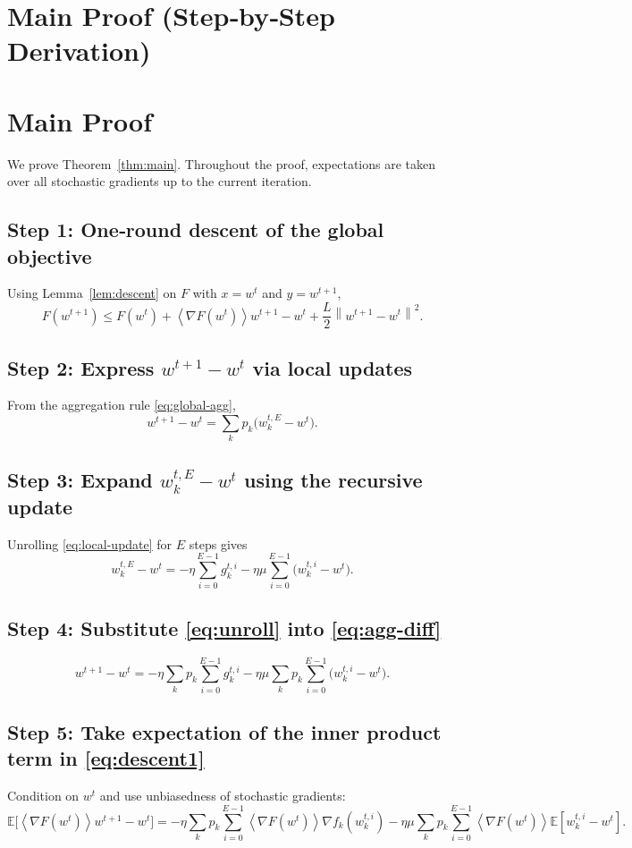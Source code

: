 \documentclass{article}
\newcommand{\E}{\mathbb{E}}
\newcommand{\norm}[1]{\left\lVert#1\right\rVert}
\newcommand{\inner}[1]{\left\langle#1\right\rangle}
\begin{document}
\section*{Main Proof (Step‑by‑Step Derivation)}
\section{Main Proof}
We prove Theorem~\ref{thm:main}.  Throughout the proof,
expectations are taken over all stochastic gradients up to the current
iteration.

\subsection*{Step 1: One‑round descent of the global objective}
Using Lemma~\ref{lem:descent} on $F$ with $x=w^{t}$ and $y=w^{t+1}$,
\[
F(w^{t+1})\le F(w^{t})+\inner{\nabla F(w^{t})}{w^{t+1}-w^{t}}
          +\frac{L}{2}\norm{w^{t+1}-w^{t}}^{2}.
\tag{1}
\label{eq:descent1}
\]

\subsection*{Step 2: Express $w^{t+1}-w^{t}$ via local updates}
From the aggregation rule \eqref{eq:global-agg},
\[
w^{t+1}-w^{t}= \sum_{k}p_k\bigl(w_{k}^{t,E}-w^{t}\bigr).
\tag{2}
\label{eq:agg-diff}
\]

\subsection*{Step 3: Expand $w_{k}^{t,E}-w^{t}$ using the recursive update}
Unrolling \eqref{eq:local-update} for $E$ steps gives
\[
w_{k}^{t,E}-w^{t}= -\eta\sum_{i=0}^{E-1}g_{k}^{t,i}
                  -\eta\mu\sum_{i=0}^{E-1}\bigl(w_{k}^{t,i}-w^{t}\bigr).
\tag{3}
\label{eq:unroll}
\]

\subsection*{Step 4: Substitute \eqref{eq:unroll} into \eqref{eq:agg-diff}}
\[
w^{t+1}-w^{t}= -\eta\sum_{k}p_k\sum_{i=0}^{E-1}g_{k}^{t,i}
               -\eta\mu\sum_{k}p_k\sum_{i=0}^{E-1}\bigl(w_{k}^{t,i}-w^{t}\bigr).
\tag{4}
\label{eq:diff-split}
\]

\subsection*{Step 5: Take expectation of the inner product term in \eqref{eq:descent1}}
Condition on $w^{t}$ and use unbiasedness of stochastic gradients:
\[
\E\!\bigl[\inner{\nabla F(w^{t})}{w^{t+1}-w^{t}}\bigr]
= -\eta\sum_{k}p_k\sum_{i=0}^{E-1}
   \inner{\nabla F(w^{t})}{\nabla f_k(w_{k}^{t,i})}
   -\eta\mu\sum_{k}p_k\sum_{i=0}^{E-1}
   \inner{\nabla F(w^{t})}{\E[w_{k}^{t,i}-w^{t}]} .
\tag{5}
\label{eq:inner-exp}
\]
\end{document}
